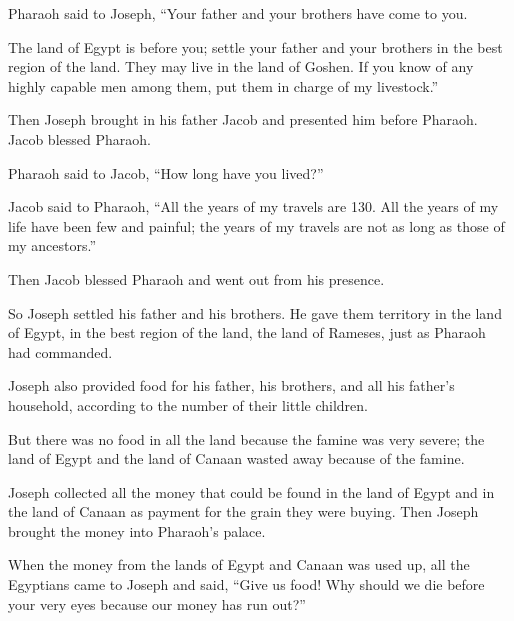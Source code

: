 \begin{scripture}
 Pharaoh said to Joseph, ``Your father and your brothers have come to you.
 The land of Egypt is before you; settle your father and your brothers in the best region of the land. They may live in the land of Goshen. If you know of any highly capable men among them, put them in charge of my livestock.''
\everypar{}

 Then Joseph brought in his father Jacob and presented him before Pharaoh. Jacob blessed Pharaoh.
 Pharaoh said to Jacob, ``How long have you lived?''
 Jacob said to Pharaoh, ``All the years of my travels are 130. All the years of my life have been few and painful; the years of my travels are not as long as those of my ancestors.''
 Then Jacob blessed Pharaoh and went out from his presence.
\everypar{}

 So Joseph settled his father and his brothers. He gave them territory in the land of Egypt, in the best region of the land, the land of Rameses, just as Pharaoh had commanded.
 Joseph also provided food for his father, his brothers, and all his father's household, according to the number of their little children.
\everypar{}

 But there was no food in all the land because the famine was very severe; the land of Egypt and the land of Canaan wasted away because of the famine.
 Joseph collected all the money that could be found in the land of Egypt and in the land of Canaan as payment for the grain they were buying. Then Joseph brought the money into Pharaoh's palace.
 When the money from the lands of Egypt and Canaan was used up, all the Egyptians came to Joseph and said, ``Give us food! Why should we die before your very eyes because our money has run out?''
\everypar{}


\end{scripture}
